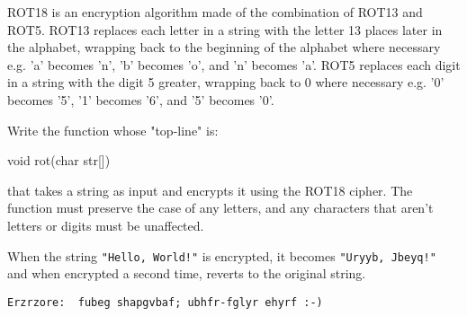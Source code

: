 


ROT18 is an encryption algorithm made of the combination of ROT13 and
ROT5. ROT13 replaces each letter in a string with the letter 13 places
later in the alphabet, wrapping back to the beginning of the alphabet
where necessary e.g. 'a' becomes 'n', 'b' becomes 'o', and 'n' becomes
'a'. ROT5 replaces each digit in a string with the digit 5 greater,
wrapping back to 0 where necessary e.g. '0' becomes '5', '1' becomes
'6', and '5' becomes '0'.


\begin{exercise}

Write the function whose "top-line" is:
\begin{codesnippet}
void rot(char str[])
\end{codesnippet}

\noindent that takes a string as input and encrypts it using the ROT18
cipher. The function must preserve the case of any letters, and any
characters that aren't letters or digits must be unaffected.

When the string \verb^"Hello, World!"^ is encrypted, it becomes
\verb^"Uryyb, Jbeyq!"^ and when encrypted a second time, reverts to the
original string.


\begin{verbatim}
Erzrzore:  fubeg shapgvbaf; ubhfr-fglyr ehyrf :-)
\end{verbatim}

\end{exercise}

